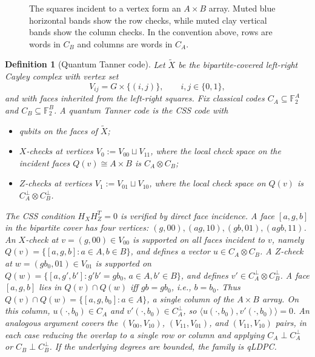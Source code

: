 \documentclass[10pt]{article}
\theoremstyle{compactdef}
\newtheorem{definition}{Definition}
\begin{document}
\begin{figure}[h]
\begin{center}
\end{center}
\caption{The squares incident to a vertex form an $A\times B$ array. Muted blue horizontal bands show the row checks, while muted clay vertical bands show the column checks. In the convention above, rows are words in $C_B$ and columns are words in $C_A$.}
\end{figure}

\begin{definition}[Quantum Tanner code]
Let $\widetilde X$ be the bipartite-covered left-right Cayley complex with vertex set
\[
V_{ij}=G\times\{(i,j)\},\qquad i,j\in\{0,1\},
\]
and with faces inherited from the left-right squares. Fix classical codes $C_A\subseteq \mathbb F_2^A$ and $C_B\subseteq \mathbb F_2^B$. A quantum Tanner code is the CSS code with
\begin{itemize}
\item qubits on the faces of $\widetilde X$;
\item $X$-checks at vertices $V_0:=V_{00}\sqcup V_{11}$, where the local check space on the incident faces $Q(v)\cong A\times B$ is $C_A\otimes C_B$;
\item $Z$-checks at vertices $V_1:=V_{01}\sqcup V_{10}$, where the local check space on $Q(v)$ is $C_A^{\perp}\otimes C_B^{\perp}$.
\end{itemize}
The CSS condition $H_X H_Z^T = 0$ is verified by direct face incidence. A face $[a,g,b]$ in the bipartite cover has four vertices: $(g,00),(ag,10),(gb,01),(agb,11)$. An $X$-check at $v=(g,00)\in V_{00}$ is supported on all faces incident to $v$, namely $Q(v)=\{[a,g,b]:a\in A,b\in B\}$, and defines a vector $u\in C_A\otimes C_B$. A $Z$-check at $w=(gb_0,01)\in V_{01}$ is supported on $Q(w)=\{[a,g',b']: g'b'=gb_0,\,a\in A,b'\in B\}$, and defines $v'\in C_A^\perp\otimes C_B^\perp$. A face $[a,g,b]$ lies in $Q(v)\cap Q(w)$ iff $gb=gb_0$, i.e., $b=b_0$. Thus $Q(v)\cap Q(w)=\{[a,g,b_0]:a\in A\}$, a single column of the $A\times B$ array. On this column, $u(\cdot,b_0)\in C_A$ and $v'(\cdot,b_0)\in C_A^\perp$, so $\langle u(\cdot,b_0),v'(\cdot,b_0)\rangle=0$. An analogous argument covers the $(V_{00},V_{10})$, $(V_{11},V_{01})$, and $(V_{11},V_{10})$ pairs, in each case reducing the overlap to a single row or column and applying $C_A\perp C_A^\perp$ or $C_B\perp C_B^\perp$. If the underlying degrees are bounded, the family is qLDPC.~\cite{QT}
\end{definition}
\end{document}
